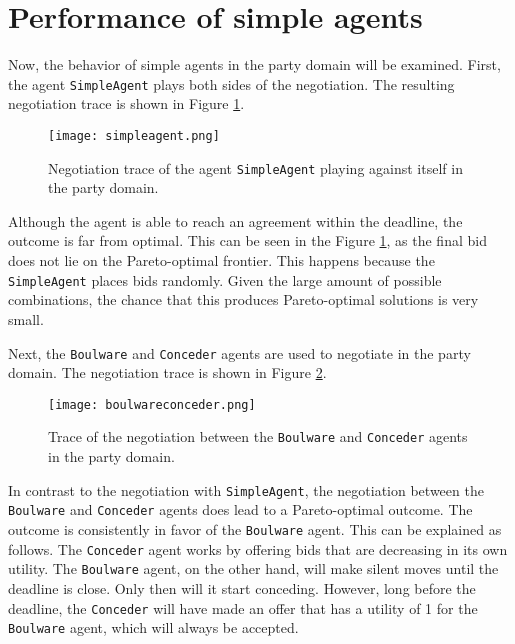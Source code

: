 \section{Performance of simple agents}

Now, the behavior of simple agents in the party domain will be examined.
First, the agent \texttt{SimpleAgent} plays both sides of the negotiation.
The resulting negotiation trace is shown in Figure \ref{fig:simpleagent}.
\begin{figure}
\centering
\texttt{[image: simpleagent.png]}
\caption{Negotiation trace of the agent \texttt{SimpleAgent} playing against itself in the party domain.}
\label{fig:simpleagent}
\end{figure}
Although the agent is able to reach an agreement within the deadline, the outcome is far from optimal.
This can be seen in the Figure \ref{fig:simpleagent}, as the final bid does not lie on the Pareto-optimal frontier.
This happens because the \texttt{SimpleAgent} places bids randomly.
Given the large amount of possible combinations, the chance that this produces Pareto-optimal solutions is very small.

Next, the \texttt{Boulware} and \texttt{Conceder} agents are used to negotiate in the party domain.
The negotiation trace is shown in Figure \ref{fig:boulwareconceder}.
\begin{figure}
\centering
\texttt{[image: boulwareconceder.png]}
\caption{Trace of the negotiation between the \texttt{Boulware} and \texttt{Conceder} agents in the party domain.}
\label{fig:boulwareconceder}
\end{figure}
In contrast to the negotiation with \texttt{SimpleAgent}, the negotiation between the \texttt{Boulware} and \texttt{Conceder} agents does lead to a Pareto-optimal outcome.
The outcome is consistently in favor of the \texttt{Boulware} agent.
This can be explained as follows.
The \texttt{Conceder} agent works by offering bids that are decreasing in its own utility.
The \texttt{Boulware} agent, on the other hand, will make silent moves until the deadline is close.
Only then will it start conceding.
However, long before the deadline, the \texttt{Conceder} will have made an offer that has a utility of 1 for the \texttt{Boulware} agent, which will always be accepted.
